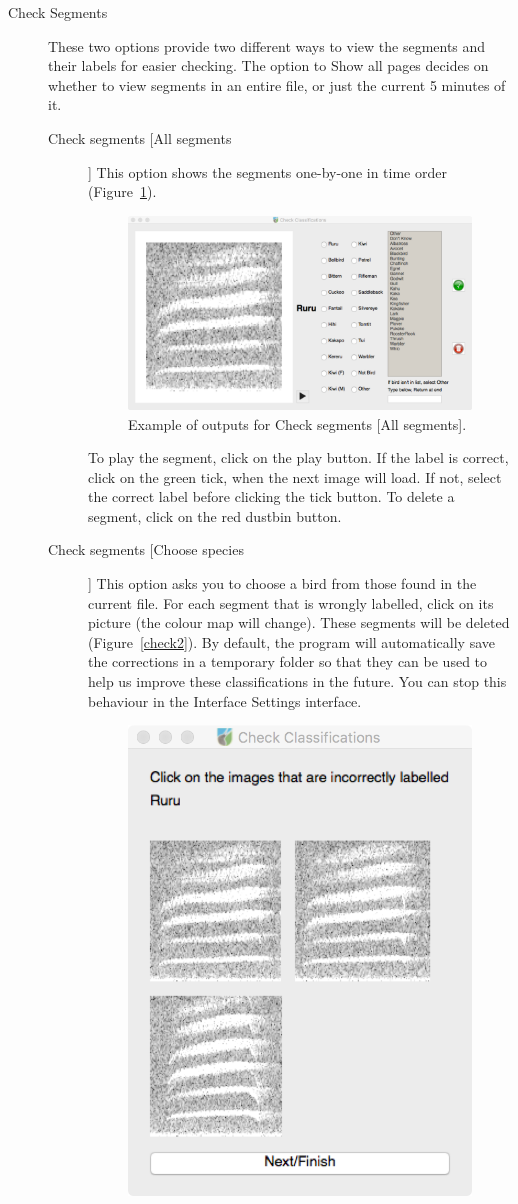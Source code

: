 \documentclass{article}
\begin{document}
\begin{description}
 
\item [Check Segments] These two options provide two different ways to view the segments and their labels for easier checking. The option to Show all pages decides on whether to view segments in an entire file, or just the current 5 minutes of it. 
	\begin{description}
	\item [Check segments [All segments]] This option shows the segments one-by-one in time order (Figure~\ref{check1}).
	\begin{figure}
	\centering
	\includegraphics[width=.6\textwidth]{Figs/Check1}
	\caption{Example of outputs for Check segments [All segments].}
	\label{check1}
	\end{figure}
	To play the segment, click on the play button. If the label is correct, click on the green tick, when the next image will load. If not, select the correct label before clicking the tick button. To delete a segment, click on the red dustbin button. 
	\item [Check segments [Choose species]] This option asks you to choose a bird from those found in the current file. For each segment that is wrongly labelled, click on its picture (the colour map will change). These segments will be deleted (Figure~\ref{check2}). By default, the program will automatically save the corrections in a temporary folder so that they can be used to help us improve these classifications in the future. You can stop this behaviour in the Interface Settings interface.
	\begin{figure}
	\centering
	\includegraphics[width=.4\textwidth]{Figs/Check2}

\end{figure}
\end{description}
\end{description}
\end{document}
